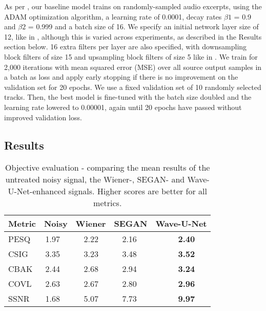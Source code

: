 \documentclass{article}
\begin{document}
As per \citep{Stoller2018Wave-U-Net:Separation}, our baseline model trains on randomly-sampled audio excerpts, using the ADAM optimization algorithm, a learning rate of 0.0001, decay rates $\beta1$ = 0.9 and $\beta2$ = 0.999 and a batch size of 16. 
We specify  
an initial network layer size of 12, like in \citep{Stoller2018Wave-U-Net:Separation}, although this is varied across experiments, as described in the Results section below. 16 extra filters per layer are also specified, with downsampling block filters of size 15 and upsampling block filters of size 5 like in \citep{Stoller2018Wave-U-Net:Separation}. We train for 2,000 iterations with mean squared error (MSE) over all source output samples in a batch as loss and apply early stopping if there is no improvement on the validation set for 20 epochs.  
We use a fixed validation set of 10 randomly selected tracks.
Then, the best model is fine-tuned  with the batch size doubled and the learning rate lowered to 0.00001, again until 20 epochs have passed without improved  validation loss.


\subsection{Results}\label{subsec:results}

\begin{table}
  \caption{Objective evaluation - comparing the mean results of the untreated noisy signal, the Wiener-, SEGAN- and Wave-U-Net-enhanced signals. Higher scores are better for all metrics.}
\label{sample-table}
  \centering
  \begin{tabular}{lllll}
    \toprule
\textbf{Metric}     &\textbf{Noisy}     &\textbf{Wiener}     &\textbf{SEGAN}     &\textbf{Wave-U-Net} \\
    \midrule
    PESQ & \,1.97 & \, \, 2.22 & \, \, 2.16 & \textbf{\, \, \, \, \, 2.40}    \\
    CSIG & \,3.35 & \, \, 3.23 & \, \, 3.48 & \textbf{\, \, \, \, \, 3.52}     \\
    CBAK & \,2.44 & \, \, 2.68 & \, \, 2.94 & \textbf{\, \, \, \, \, 3.24}     \\
    COVL & \,2.63 & \, \, 2.67 & \, \, 2.80 & \textbf{\, \, \, \, \, 2.96}     \\
    SSNR & \,1.68 & \, \, 5.07 & \, \, 7.73 & \textbf{\, \, \, \, \, 9.97}     \\
    
\bottomrule
  \end{tabular}
\end{table}
\end{document}
